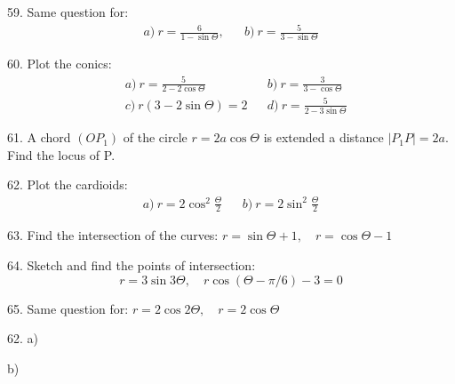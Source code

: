 \documentclass[11pt]{amsbook}
\begin{document}
	59. Same question for:
	\begin{align*}
		a)\ r = \frac{6}{1 - \sin{\Theta}},&& b)\ r = \frac{5}{3 - \sin{\Theta}}
	\end{align*}
	
	60. Plot the conics:
	\begin{align*}
		&a)\ r = \frac{5}{2 - 2 \cos{\Theta}} &&  b)\ r = \frac{3}{3 - \cos{\Theta}}\\
		&c)\ r\left(3-2\sin{\Theta}\right) = 2  && d)\ r = \frac{5}{2-3\sin{\Theta}}
	\end{align*}
	
	61. A chord $\left(OP_1\right)$ of the circle $r = 2a \cos{\Theta}$ is extended a distance $|P_1P| = 2a$. Find the locus of P.
	
	62. Plot the cardioids:
	\begin{align*}
		a)\ r = 2 \cos^2{\frac{\Theta}{2}} && b)\ r = 2 \sin^2{\frac{\Theta}{2}}
	\end{align*}
	
	63. Find the intersection of the curves: $r = \sin{\Theta}+1,\quad r = \cos{\Theta} - 1$
	
	64. Sketch and find the points of intersection:
	\begin{equation*}
		r = 3 \sin{3 \Theta},\quad   r \cos{\left(\Theta - \pi / 6\right)} - 3 = 0
	\end{equation*}
	
	65. Same question for: $r = 2 \cos{2 \Theta},\quad r = 2 \cos{\Theta}$
	
 62. \hspace{2mm} a) 
 
\hspace{72mm} b)


 
\end{document}
